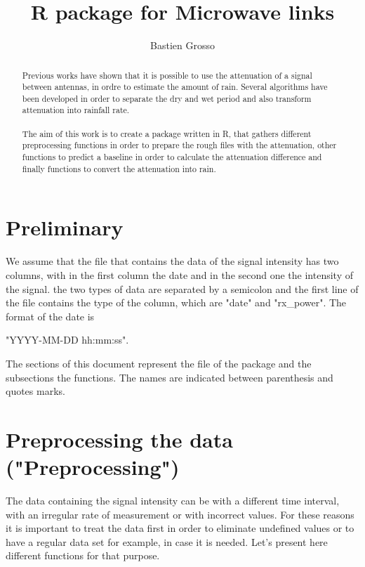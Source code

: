 \documentclass[a4wide,12pt]{article}
\title{R package for Microwave links}
\author{Bastien Grosso}
\begin{document}
\maketitle

\begin{abstract}
\noindent Previous works have shown that it is possible to use the attenuation of a signal between antennas, in ordre to estimate the amount of rain. Several algorithms have been developed in order to separate the dry and wet period and also transform attenuation into rainfall rate.
\\ \\
The aim of this work is to create a package written in R, that gathers different preprocessing functions in order to prepare the rough files with the attenuation, other functions to predict a baseline in order to calculate the attenuation difference and finally functions to convert the attenuation into rain.

\end{abstract}

\section{Preliminary}
We assume that the file that contains the data of the signal intensity has two columns, with in the first column the date and in the second one the intensity of the signal. the two types of data are separated by a semicolon and the first line of the file contains the type of the column, which are "date" and "rx\_power". The format of the date is 
\begin{center}"YYYY-MM-DD hh:mm:ss".\end{center}

The sections of this document represent the file of the package and the subsections the functions. The names are indicated between parenthesis and quotes marks.

\section{Preprocessing the data ("Preprocessing")}
The data containing the signal intensity can be with a different time interval, with an irregular rate of measurement or with incorrect values. For these reasons it is important to treat the data first in order to eliminate undefined values or to have a regular data set for example, in case it is needed. Let's present here different functions for that purpose. 
\end{document}
